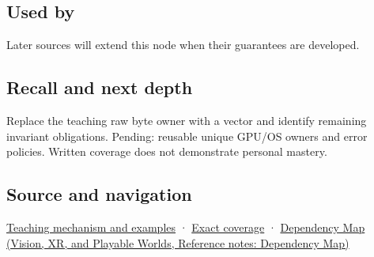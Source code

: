 \subsection{Used by}\label{appendix-7679107d057e-used-by}

\hypertarget{appendix-7679107d057e-used-by}{}

Later sources will extend this node when their guarantees are developed.

\subsection{Recall and next depth}\label{appendix-7679107d057e-recall-and-next-depth}

\hypertarget{appendix-7679107d057e-recall-and-next-depth}{}

Replace the teaching raw byte owner with a vector and identify remaining invariant obligations. Pending: reusable unique GPU/OS owners and error policies. Written coverage does not demonstrate personal mastery.

\subsection{Source and navigation}\label{appendix-7679107d057e-source-and-navigation}

\hypertarget{appendix-7679107d057e-source-and-navigation}{}

\hyperref[01-foundations-i-ch003-from-three-repairs-to-five-decisions-to-zero-boilerplate]{Teaching mechanism and examples} · \hyperref[appendix-fd090d982a15-m009---parts-127-147]{Exact coverage} · \href{../07-Vision-XR-and-Playable-Worlds/main.pdf\#nameddest=appendix-4ad47bdd269a}{Dependency Map (Vision, XR, and Playable Worlds, Reference notes: Dependency Map)}
